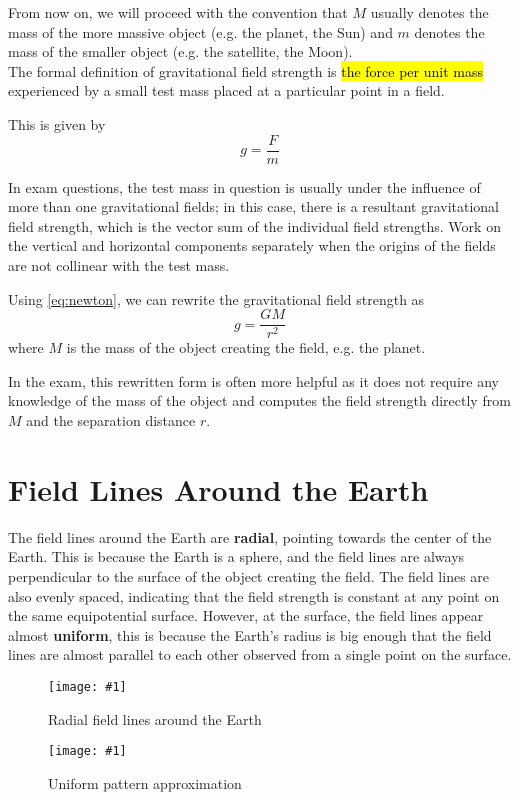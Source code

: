 \documentclass[a4paper,12pt]{article}
\let\oldsection\section
\renewcommand\section{\clearpage\oldsection}
\newcommand{\lb}{\\[8pt]}
\newcommand{\img}[4]{\begin{center}
  \begin{figure}[H]
    \centering
    \texttt{[image: \#1]}
    \caption{#3}
    \label{fig:#4}
  \end{figure}
\end{center}}
\begin{document}
From now on, we will proceed with the convention that $M$ usually denotes the mass of the more massive object (e.g. the planet, the Sun) and $m$ denotes the mass of the smaller object (e.g. the satellite, the Moon).\lb

The formal definition of gravitational field strength is \hl{the force per unit mass} experienced by a small test mass placed at a particular point in a field.

This is given by $$g = \frac{F}{m}$$

In exam questions, the test mass in question is usually under the influence of more than one gravitational fields; in this case, there is a resultant gravitational field strength, which is the vector sum of the individual field strengths. Work on the vertical and horizontal components separately when the origins of the fields are not collinear with the test mass.

Using \cref{eq:newton}, we can rewrite the gravitational field strength as
$$g = \frac{GM}{r^2}$$
where $M$ is the mass of the object creating the field, e.g. the planet.

In the exam, this rewritten form is often more helpful as it does not require any knowledge of the mass of the object and computes the field strength directly from $M$ and the separation distance $r$.

\section{Field Lines Around the Earth}

The field lines around the Earth are \textbf{radial}, pointing towards the center of the Earth. This is because the Earth is a sphere, and the field lines are always perpendicular to the surface of the object creating the field. The field lines are also evenly spaced, indicating that the field strength is constant at any point on the same equipotential surface. However, at the surface, the field lines appear almost \textbf{uniform}, this is because the Earth's radius is big enough that the field lines are almost parallel to each other observed from a single point on the surface.

\begin{minipage}{0.35\textwidth}
  \img{earthradial.png}{1}{Radial field lines around the Earth}{earthradial}
\end{minipage}\hspace*{0.1\textwidth}%
\begin{minipage}{0.55\textwidth}
  \img{earthuniform.png}{1}{Uniform pattern approximation}{earthuniform}
\end{minipage}
\end{document}
